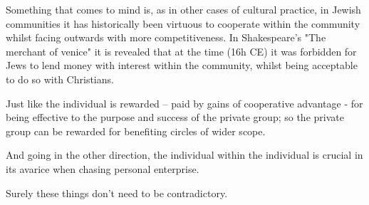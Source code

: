 \vspace{10pt}
\noindent
Something that comes to mind is,  as in other cases of cultural practice,  in Jewish communities it has historically been virtuous to cooperate within the community whilst facing outwards with more competitiveness.  In Shakespeare's "The merchant of venice" it is revealed that at the time (16h CE) it was forbidden for Jews to lend money with interest within the community,  whilst being acceptable to do so with Christians. \par

\vspace{10pt}
\noindent
Just like the individual is rewarded -- paid by gains of cooperative advantage - for being effective to the purpose and success of the private group; so the private group can be rewarded for benefiting circles of wider scope.\par 
And going in the other direction, the individual within the individual is crucial in its avarice when chasing personal enterprise. \par 
Surely these things don't need to be contradictory. 










